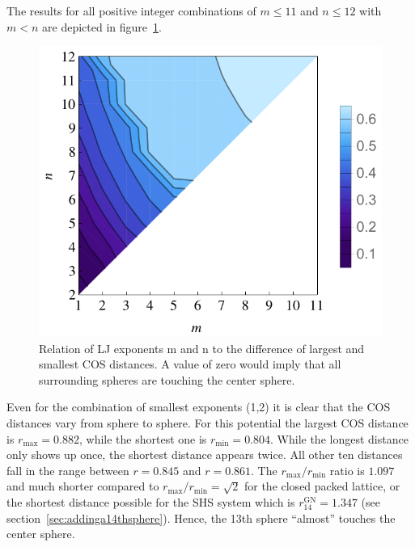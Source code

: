 The results for all positive integer combinations of $m\leq11$ and $n\leq12$
with $m<n$ are depicted in figure~\ref{fig:gregorynewton-N14}. 
%
\begin{figure}[htb]
    \centering
    \includegraphics[width=.8\textwidth]{gregory-newton/N14.pdf}
    \caption{Relation of \acs{LJ} exponents m and n to the difference of
    largest and smallest \acs{COS} distances.  A value of zero would imply that
    all surrounding spheres are touching the center sphere.}
    \label{fig:gregorynewton-N14}
\end{figure}
%
Even for the combination of smallest exponents (1,2) it is clear that the
\ac{COS} distances vary from sphere to sphere. For this potential the largest
\ac{COS} distance is $r_\text{max}=0.882$, while the shortest one is
$r_\text{min}=0.804$. While the longest distance only shows up once, the
shortest distance appears twice. All other ten distances fall in the range
between $r = 0.845$ and $r = 0.861$. The $r_\text{max} /r_\text{min}$ ratio is
$1.097$ and much shorter compared to $r_\text{max} /r_\text{min}= \sqrt{2}$ for
the closed packed lattice, or the shortest distance possible for the \ac{SHS}
system which is $r_{14}^\text{GN} = 1.347$ (see
section~\ref{sec:addinga14thsphere}). Hence, the 13th sphere ``almost'' touches
the center sphere.

